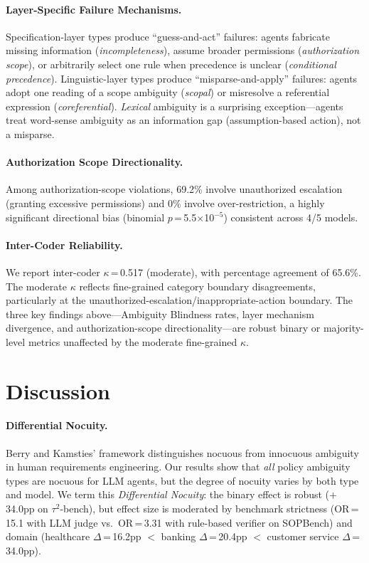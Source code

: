 \documentclass[11pt,a4paper]{article}
\begin{document}
\paragraph{Layer-Specific Failure Mechanisms.}
Specification-layer types produce ``guess-and-act'' failures: agents fabricate missing information (\emph{incompleteness}), assume broader permissions (\emph{authorization scope}), or arbitrarily select one rule when precedence is unclear (\emph{conditional precedence}).
Linguistic-layer types produce ``misparse-and-apply'' failures: agents adopt one reading of a scope ambiguity (\emph{scopal}) or misresolve a referential expression (\emph{coreferential}).
\emph{Lexical} ambiguity is a surprising exception---agents treat word-sense ambiguity as an information gap (assumption-based action), not a misparse.

\paragraph{Authorization Scope Directionality.}
Among authorization-scope violations, 69.2\% involve unauthorized escalation (granting excessive permissions) and 0\% involve over-restriction, a highly significant directional bias (binomial $p$\,=\,5.5$\times$10$^{-5}$) consistent across 4/5 models.

\paragraph{Inter-Coder Reliability.}
We report inter-coder $\kappa$\,=\,0.517 (moderate), with percentage agreement of 65.6\%.
The moderate $\kappa$ reflects fine-grained category boundary disagreements, particularly at the unauthorized-escalation/inappropriate-action boundary.
The three key findings above---Ambiguity Blindness rates, layer mechanism divergence, and authorization-scope directionality---are robust binary or majority-level metrics unaffected by the moderate fine-grained $\kappa$.

\section{Discussion}

\paragraph{Differential Nocuity.}
Berry and Kamsties' framework distinguishes nocuous from innocuous ambiguity in human requirements engineering.
Our results show that \emph{all} policy ambiguity types are nocuous for LLM agents, but the degree of nocuity varies by both type and model.
We term this \emph{Differential Nocuity}: the binary effect is robust ($+$34.0pp on $\tau^2$-bench), but effect size is moderated by benchmark strictness (OR\,=\,15.1 with LLM judge vs.\ OR\,=\,3.31 with rule-based verifier on SOPBench) and domain (healthcare $\Delta$\,=\,16.2pp $<$ banking $\Delta$\,=\,20.4pp $<$ customer service $\Delta$\,=\,34.0pp).
\end{document}
